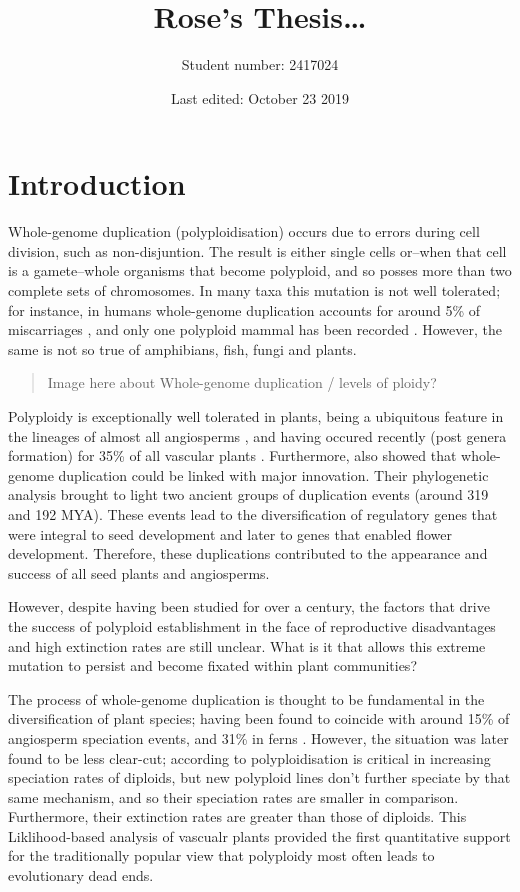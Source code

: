 \documentclass[openany, 12pt, draft]{book}
\title{Rose's Thesis\ldots{}}
\author{Student number: 2417024}
\date{Last edited: October 23 2019}
\begin{document}
\maketitle

{
\setcounter{tocdepth}{1}
\tableofcontents
}
\chapter{Introduction}\label{intro}

Whole-genome duplication (polyploidisation) occurs due to errors during
cell division, such as non-disjuntion. The result is either single cells
or--when that cell is a gamete--whole organisms that become polyploid,
and so posses more than two complete sets of chromosomes. In many taxa
this mutation is not well tolerated; for instance, in humans
whole-genome duplication accounts for around 5\% of miscarriages
\citep{REFNEEDED}, and only one polyploid mammal has been recorded
\citep{REFNEEDED}. However, the same is not so true of amphibians, fish,
fungi and plants.

\begin{quote}
Image here about Whole-genome duplication / levels of ploidy?
\end{quote}

Polyploidy is exceptionally well tolerated in plants, being a ubiquitous
feature in the lineages of almost all angiosperms \citep{Jiao2011}, and
having occured recently (post genera formation) for 35\% of all vascular
plants \citep{Wood2009}. Furthermore, \citet{Jiao2011} also showed that
whole-genome duplication could be linked with major innovation. Their
phylogenetic analysis brought to light two ancient groups of duplication
events (around 319 and 192 MYA). These events lead to the
diversification of regulatory genes that were integral to seed
development and later to genes that enabled flower development.
Therefore, these duplications contributed to the appearance and success
of all seed plants and angiosperms.

However, despite having been studied for over a century, the factors
that drive the success of polyploid establishment in the face of
reproductive disadvantages and high extinction rates are still unclear.
What is it that allows this extreme mutation to persist and become
fixated within plant communities?

The process of whole-genome duplication is thought to be fundamental in
the diversification of plant species; having been found to coincide with
around 15\% of angiosperm speciation events, and 31\% in ferns
\citep{Wood2009}. However, the situation was later found to be less
clear-cut; according to \citet{Mayrose2011} polyploidisation is critical
in increasing speciation rates of diploids, but new polyploid lines
don't further speciate by that same mechanism, and so their speciation
rates are smaller in comparison. Furthermore, their extinction rates are
greater than those of diploids. This Liklihood-based analysis of
vascualr plants provided the first quantitative support for the
traditionally popular view that polyploidy most often leads to
evolutionary dead ends.
\end{document}
